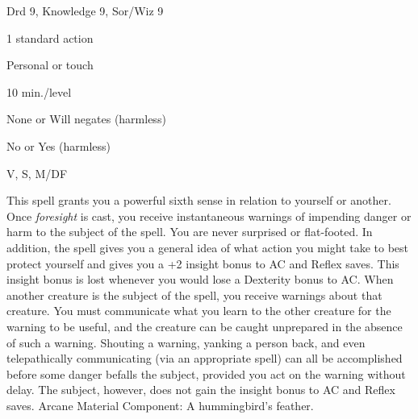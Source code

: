 
\begin{description*}
\item[Level:] Drd 9, Knowledge 9, Sor/Wiz 9
\item[Casting Time:] 1 standard action
\item[Range:] Personal or touch
\item[Duration:] 10 min./level
\item[Saving Throw:] None or Will negates (harmless)
\item[Spell Resistance:] No or Yes (harmless)
\item[Components:] V, S, M/DF
\end{description*}

This spell grants you a powerful sixth sense in relation to yourself or another.
Once \textit{foresight} is cast, you receive instantaneous warnings of impending
danger or harm to the subject of the spell. You are never surprised or flat-footed.
In addition, the spell gives you a general idea of what action you might take to
best protect yourself and gives you a +2 insight bonus to AC and Reflex saves.
This insight bonus is lost whenever you would lose a Dexterity bonus to AC.
When another creature is the subject of the spell, you receive warnings about that
creature. You must communicate what you learn to the other creature for the warning
to be useful, and the creature can be caught unprepared in the absence of such
a warning. Shouting a warning, yanking a person back, and even telepathically communicating
(via an appropriate spell) can all be accomplished before some danger befalls the
subject, provided you act on the warning without delay. The subject, however, does
not gain the insight bonus to AC and Reflex saves.
Arcane Material Component: A hummingbird's feather.